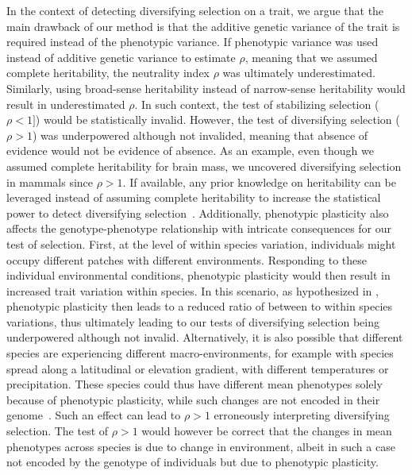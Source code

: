 \documentclass{article}
\newcommand{\NI}{\rho}
\begin{document}
In the context of detecting diversifying selection on a trait, we argue that the main drawback of our method is that the additive genetic variance of the trait is required instead of the phenotypic variance.
If phenotypic variance was used instead of additive genetic variance to estimate $\NI$, meaning that we assumed complete heritability, the neutrality index $\NI$ was ultimately underestimated.
Similarly, using broad-sense heritability instead of narrow-sense heritability would result in underestimated $\NI$.
In such context, the test of stabilizing selection ($\NI < 1]$) would be statistically invalid.
However, the test of diversifying selection ($\NI > 1$) was underpowered although not invalided, meaning that absence of evidence would not be evidence of absence.
As an example, even though we assumed complete heritability for brain mass, we uncovered diversifying selection in mammals since $\NI > 1$.
If available, any prior knowledge on heritability can be leveraged instead of assuming complete heritability to increase the statistical power to detect diversifying selection~\citep{hansen_heritability_2011, hansen_evolvability_2021}.
Additionally, phenotypic plasticity also affects the genotype-phenotype relationship with intricate consequences for our test of selection.
First, at the level of within species variation, individuals might occupy different patches with different environments. Responding to these individual environmental conditions, phenotypic plasticity would then result in increased trait variation within species.
In this scenario, as hypothesized in \citet{rohlfs_phylogenetic_2015}, phenotypic plasticity then leads to a reduced ratio of between to within species variations, thus ultimately leading to our tests of diversifying selection being underpowered although not invalid.
Alternatively, it is also possible that different species are experiencing different macro-environments, for example with species spread along a latitudinal or elevation gradient, with different temperatures or precipitation.
These species could thus have different mean phenotypes solely because of phenotypic plasticity, while such changes are not encoded in their genome~\citep{stamp_relative_2020, schraiber_heritability_2023}.
Such an effect can lead to $\NI > 1$ erroneously interpreting diversifying selection.
The test of $\NI > 1$ would however be correct that the changes in mean phenotypes across species is due to change in environment, albeit in such a case not encoded by the genotype of individuals but due to phenotypic plasticity.
\end{document}
